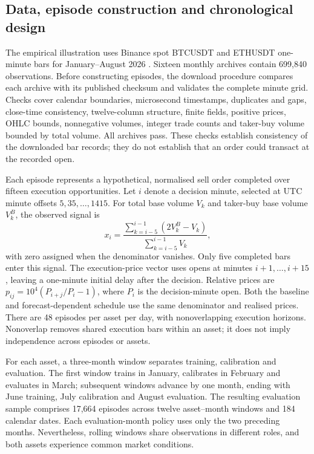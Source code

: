 \subsection{Data, episode construction and chronological design}
\label{sec:data}
The empirical illustration uses Binance spot BTCUSDT and ETHUSDT one-minute bars for January--August 2026 \citep{binance2026}. Sixteen monthly archives contain 699,840 observations. Before constructing episodes, the download procedure compares each archive with its published checksum and validates the complete minute grid. Checks cover calendar boundaries, microsecond timestamps, duplicates and gaps, close-time consistency, twelve-column structure, finite fields, positive prices, OHLC bounds, nonnegative volumes, integer trade counts and taker-buy volume bounded by total volume. All archives pass. These checks establish consistency of the downloaded bar records; they do not establish that an order could transact at the recorded open.

Each episode represents a hypothetical, normalised sell order completed over fifteen execution opportunities. Let $i$ denote a decision minute, selected at UTC minute offsets $5,35,\ldots,1415$. For total base volume $V_k$ and taker-buy base volume $V_k^B$, the observed signal is
\begin{equation}
 x_i=\frac{\sum_{k=i-5}^{i-1}(2V_k^B-V_k)}{\sum_{k=i-5}^{i-1}V_k},
 \label{eq:imbalance}
\end{equation}
with zero assigned when the denominator vanishes. Only five completed bars enter this signal. The execution-price vector uses opens at minutes $i+1,\ldots,i+15$, leaving a one-minute initial delay after the decision. Relative prices are $p_{ij}=10^4(P_{i+j}/P_i-1)$, where $P_i$ is the decision-minute open. Both the baseline and forecast-dependent schedule use the same denominator and realised prices. There are 48 episodes per asset per day, with nonoverlapping execution horizons. Nonoverlap removes shared execution bars within an asset; it does not imply independence across episodes or assets.

For each asset, a three-month window separates training, calibration and evaluation. The first window trains in January, calibrates in February and evaluates in March; subsequent windows advance by one month, ending with June training, July calibration and August evaluation. The resulting evaluation sample comprises 17,664 episodes across twelve asset--month windows and 184 calendar dates. Each evaluation-month policy uses only the two preceding months. Nevertheless, rolling windows share observations in different roles, and both assets experience common market conditions.


